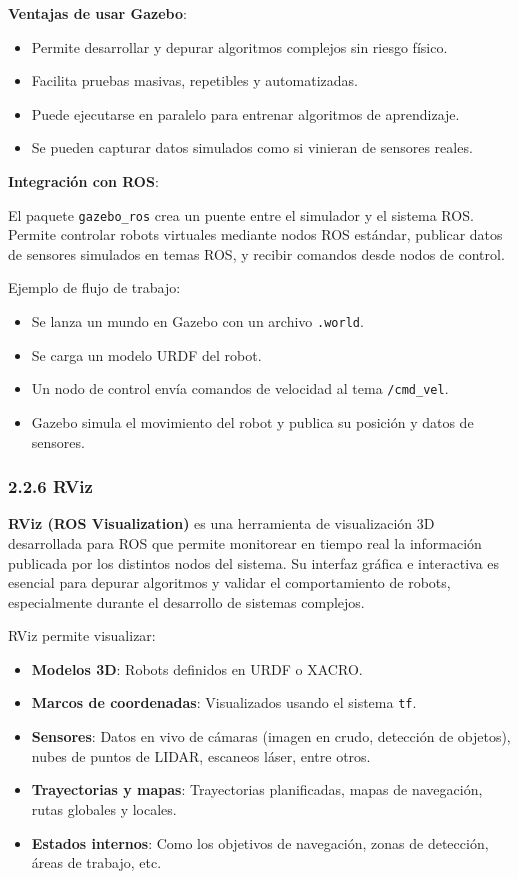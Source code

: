 \textbf{Ventajas de usar Gazebo}:
\begin{itemize}
	\item Permite desarrollar y depurar algoritmos complejos sin riesgo físico.
	\item Facilita pruebas masivas, repetibles y automatizadas.
	\item Puede ejecutarse en paralelo para entrenar algoritmos de aprendizaje.
	\item Se pueden capturar datos simulados como si vinieran de sensores reales.
\end{itemize}

\textbf{Integración con ROS}:

El paquete \texttt{gazebo\_ros} crea un puente entre el simulador y el sistema ROS. Permite controlar robots virtuales mediante nodos ROS estándar, publicar datos de sensores simulados en temas ROS, y recibir comandos desde nodos de control.

Ejemplo de flujo de trabajo:
\begin{itemize}
	\item Se lanza un mundo en Gazebo con un archivo \texttt{.world}.
	\item Se carga un modelo URDF del robot.
	\item Un nodo de control envía comandos de velocidad al tema \texttt{/cmd\_vel}.
	\item Gazebo simula el movimiento del robot y publica su posición y datos de sensores.
\end{itemize}

\subsubsection{2.2.6 RViz}

\textbf{RViz (ROS Visualization)} es una herramienta de visualización 3D desarrollada para ROS que permite monitorear en tiempo real la información publicada por los distintos nodos del sistema. Su interfaz gráfica e interactiva es esencial para depurar algoritmos y validar el comportamiento de robots, especialmente durante el desarrollo de sistemas complejos.

RViz permite visualizar:
\begin{itemize}
	\item \textbf{Modelos 3D}: Robots definidos en URDF o XACRO.
	\item \textbf{Marcos de coordenadas}: Visualizados usando el sistema \texttt{tf}.
	\item \textbf{Sensores}: Datos en vivo de cámaras (imagen en crudo, detección de objetos), nubes de puntos de LIDAR, escaneos láser, entre otros.
	\item \textbf{Trayectorias y mapas}: Trayectorias planificadas, mapas de navegación, rutas globales y locales.
	\item \textbf{Estados internos}: Como los objetivos de navegación, zonas de detección, áreas de trabajo, etc.
\end{itemize}

